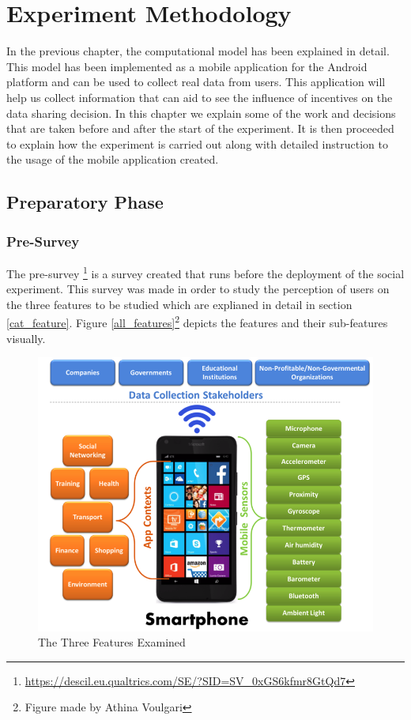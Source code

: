 \chapter{Experiment Methodology} \label{exp}

In the previous chapter, the computational model has been explained in detail. This model has been implemented as a mobile application for the Android platform and can be used to collect real data from users. This application will help us collect information that can aid to see the influence of incentives on the data sharing decision. In this chapter we explain some of the work and decisions that are taken before and after the start of the experiment. It is then proceeded to explain how the experiment is carried out along with detailed instruction to the usage of the mobile application created. 

\section{Preparatory Phase}

\subsection{Pre-Survey}

The pre-survey \footnote{\url{https://descil.eu.qualtrics.com/SE/?SID=SV_0xGS6kfmr8GtQd7}} is a survey created that runs before the deployment of the social experiment. This
survey was made in order to study the perception of users on the three features to be studied which are explianed in detail in section \ref{cat_feature}. Figure \ref{all_features}\footnote{Figure made by Athina Voulgari} depicts the features and their sub-features visually.

\begin{figure}[ht!]
\centering
\includegraphics[width=\textwidth,keepaspectratio]{./images/all_features}
\caption{The Three Features Examined}
\label{fig:all_features}
\end{figure}

